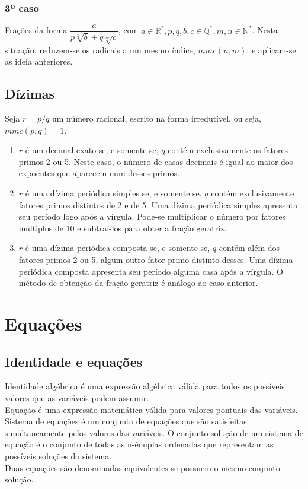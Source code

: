 \documentclass{article}
\begin{document}
\subsubsection{3º caso}
Frações da forma $\dfrac{a}{p\sqrt[n]{b}\pm q\sqrt[m]{c}}$, com $a\in\mathbb{R^*},p,q,b,c\in\mathbb{Q^*},m,n\in\mathbb{N^*}$. Nesta situação, reduzem-se os radicais a um mesmo índice, $mmc(n,m)$, e aplicam-se as ideia anteriores.

\subsection{Dízimas}
Seja $r=p/q$ um número racional, escrito na forma irredutível, ou seja, $mmc(p,q)=1$.
\begin{enumerate}
    \item $r$ é um decimal exato se, e somente se, $q$ contém exclusivamente os fatores primos 2 ou 5. Neste caso, o número de casas decimais é igual ao maior dos expoentes que aparecem num desses primos.
    \item $r$ é uma dízima periódica simples se, e somente se, $q$  contém exclusivamente fatores primos distintos de 2 e de 5. Uma dízima periódica simples apresenta seu período logo após a vírgula. Pode-se multiplicar o número por fatores múltiplos de 10 e subtraí-los para obter a fração geratriz.
    \item $r$ é uma dízima periódica composta se, e somente se, $q$  contém além dos fatores primos 2 ou 5, algum outro fator primo distinto desses. Uma dízima periódica composta apresenta seu período alguma casa após a vírgula. O método de obtenção da fração geratriz é análogo ao caso anterior.
\end{enumerate}

\section{Equações}
\subsection{Identidade e equações}
Identidade algébrica é uma expressão algébrica válida para todos os possíveis valores que as variáveis podem assumir.\\
\indent Equação é uma expressão matemática válida para valores pontuais das variáveis.\\
\indent Sistema de equações é um conjunto de equações que são satisfeitas simultaneamente pelos valores das variáveis. O conjunto solução de um sistema de equação é o conjunto de todas as n-ênuplas ordenadas que representam as possíveis soluções do sistema.\\
\indent Duas equações são denominadas equivalentes se possuem o mesmo conjunto solução.
\end{document}
